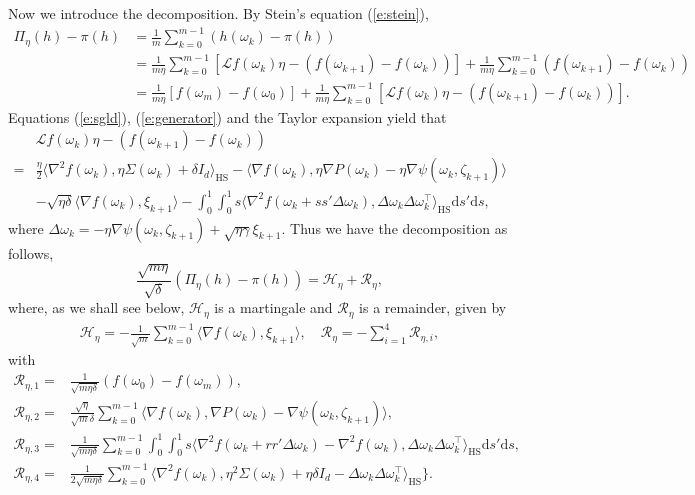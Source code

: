\documentclass[12pt]{amsart}
\theoremstyle{definition}
\theoremstyle{remark}
\numberwithin{equation}{section}
\newcommand{\dif}{\mathrm{d}}
\newcommand{\Ll}{\langle}
\newcommand{\Rr}{\rangle}
\begin{document}
Now we introduce the decomposition. By Stein's equation (\ref{e:stein}),
\begin{align*}
	\Pi_\eta(h)-\pi(h)&=\frac{1}{m}\sum_{k=0}^{m-1}\left(h(\omega_k )-\pi(h)\right)\\
	&=\frac1{m\eta}\sum_{k=0}^{m-1}\left[\mathcal{L}f(\omega_k )\eta-\left(f(\omega_{k+1} )-f(\omega_k )\right)\right]+\frac1{m\eta}\sum_{k=0}^{m-1}\left(f(\omega_{k+1} )-f(\omega_k )\right)\\
	&=\frac1{m\eta}[f(\omega_m )-f(\omega_0 )]+\frac1{m\eta}\sum_{k=0}^{m-1}\left[\mathcal{L}f(\omega_k )\eta-(f(\omega_{k+1} )-f(\omega_k ))\right].
\end{align*}
Equations (\ref{e:sgld}), (\ref{e:generator}) and the Taylor expansion yield that
\begin{align*}
	&\mathcal{L}f(\omega_k )\eta-(f(\omega_{k+1} )-f(\omega_k ))\\
	=& \frac\eta2\Ll \nabla^2f(\omega_k ), \eta\Sigma(\omega_k)+\delta I_d\Rr_\mathrm{HS}
	-\Ll \nabla f(\omega_k),\eta\nabla P(\omega_k)-\eta\nabla\psi(\omega_k,\zeta_{k+1})\Rr\\
	&-\sqrt{\eta\delta}\Ll \nabla f(\omega_k ),\xi_{k+1}\Rr
	-\int_0^1\int_0^1s\Ll\nabla^2 f(\omega_k+ss'\Delta\omega_k), \Delta \omega_k\Delta \omega_k^\top\Rr_\mathrm{HS}\dif s'\dif s,
\end{align*}
where $\Delta\omega_k=-\eta \nabla \psi(\omega_{k},\zeta_{k+1})+\sqrt{\eta\gamma} \xi_{k+1}$. Thus we have the decomposition as follows,
\begin{equation}  \label{e:Decompose}
	\frac{\sqrt{m\eta}}{\sqrt\delta}(\Pi_\eta(h)-\pi(h))= \mathcal{H}_\eta+\mathcal{R}_\eta,
\end{equation}
where, as we shall see below, $\mathcal{H}_\eta$ is a martingale and $\mathcal{R}_\eta$ is a remainder, given by
\begin{align*}
	\mathcal{H}_\eta = -\frac{1}{\sqrt{m}}\sum_{k=0}^{m-1}\Ll\nabla f(\omega_k ),\xi_{k+1}\Rr,\quad \mathcal{R}_\eta=-\sum_{i=1}^4\mathcal{R}_{\eta,i},
\end{align*}
with
\begin{align*}
	\mathcal{R}_{\eta,1}=&\frac1{\sqrt{m\eta\delta}}(f(\omega_0)-f(\omega_m )),\\
	\mathcal{R}_{\eta,2}=&\frac{\sqrt\eta}{\sqrt m\delta}\sum_{k=0}^{m-1}\Ll \nabla f(\omega_k),\nabla P(\omega_k)-\nabla\psi(\omega_k,\zeta_{k+1})\Rr,\\
	\mathcal{R}_{\eta,3}=&\frac{1}{\sqrt{m\eta\delta}}\sum_{k=0}^{m-1}
	\int_0^1\int_0^1s \Ll \nabla^2 f(\omega_k+rr'\Delta\omega_k)-\nabla^2f(\omega_k ), \Delta \omega_k\Delta \omega_k^\top\Rr_\mathrm{HS}\dif s'\dif s,\\
	\mathcal{R}_{\eta,4}=& \frac{1}{2\sqrt{m\eta\delta}}\sum_{k=0}^{m-1}\Ll \nabla^2f(\omega_k ), \eta^2\Sigma(\omega_k)+\eta\delta I_d-\Delta\omega_k\Delta\omega_k^\top\Rr_\mathrm{HS}
	\big\}.
\end{align*}
\end{document}
